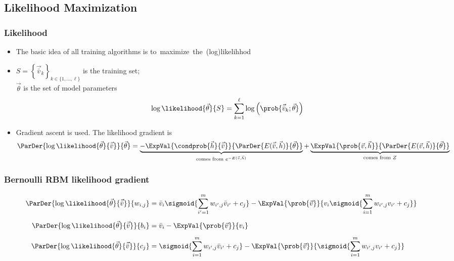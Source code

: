 \subsection{Likelihood Maximization}
\begin{frame}
\frametitle{Likelihood}
  \begin{itemize}
		\item The basic idea of all training algorithms is \alert{to~maximize~the~(log)likelihhod}
		\item \(S = \left\{\vec{\bar{v}}_k\right\}_{k \in \{1,\dots,\ell\}}\) is the training set;\\
      \(\vec{\theta}\) is the set of model parameters
		  \[
			 \log\likelihood{\vec{\theta}}{S} = \sum_{k=1}^\ell \log\left(\prob{\vec{\bar{v}}_k;\vec{\theta}}\right)
		  \]
		\pause
    \item \alert{Gradient ascent} is used. The likelihood gradient is
      \[
         \ParDer{\log\likelihood{\vec{\theta}}{\vec{\bar{v}}}}{\vec{\theta}} =
         	\underbrace{-\ExpVal{\condprob{\vec{h}}{\vec{\bar{v}}}}{\ParDer{E(\vec{\bar{v}},\vec{h})}{\vec{\theta}}}}_{\text{comes from } e^{-E(\vec{\bar{v}},\vec{h})}}
          +\underbrace{\ExpVal{\prob{\vec{v},\vec{h}}}{\ParDer{E(\vec{v},\vec{h})}{\vec{\theta}}}}_{\text{comes from } Z}
      \]
	\end{itemize}
\end{frame}

\begin{frame}
  \frametitle{Bernoulli RBM likelihood gradient}
  \begin{align*}
    \ParDer{\log\likelihood{\vec{\theta}}{\vec{\bar{v}}}}{w_{i,j}}
    &= \bar{v}_i \sigmoid{\sum_{i'=1}^m w_{i',j}\bar{v}_{i'}+c_j}
    -\ExpVal{\prob{\vec{v}}}{v_i \sigmoid{\sum_{i=1}^m w_{i',j}v_{i'}+c_j}} \\[5pt]
    \ParDer{\log\likelihood{\vec{\theta}}{\vec{\bar{v}}}}{b_i}
    &= \bar{v}_i -\ExpVal{\prob{\vec{v}}}{v_i} \\[5pt]
    \ParDer{\log\likelihood{\vec{\theta}}{\vec{\bar{v}}}}{c_j}
    &= \sigmoid{\sum_{i=1}^m w_{i',j}\bar{v}_{i'}+c_j}
    -\ExpVal{\prob{\vec{v}}}{\sigmoid{\sum_{i=1}^m w_{i',j}v_{i'}+c_j}}
  \end{align*}
\end{frame}



